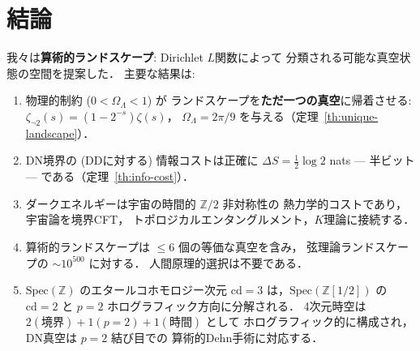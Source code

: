 \documentclass[11pt,a4paper]{article}
\begin{document}
\section{結論}

我々は\textbf{算術的ランドスケープ}: Dirichlet $L$関数によって
分類される可能な真空状態の空間を提案した．
主要な結果は:

\begin{enumerate}
\item 物理的制約 ($0 < \Omega_\Lambda < 1$) が
ランドスケープを\textbf{ただ一つの真空}に帰着させる:
$\zeta_{\neg 2}(s) = (1-2^{-s})\zeta(s)$，
$\Omega_\Lambda = 2\pi/9$ を与える（定理~\ref{th:unique-landscape}）．

\item DN境界の (DDに対する) 情報コストは正確に
$\Delta S = \frac{1}{2}\log 2$ nats --- 半ビット ---
である（定理~\ref{th:info-cost}）．

\item ダークエネルギーは宇宙の時間的 $\mathbb{Z}/2$ 非対称性の
熱力学的コストであり，宇宙論を境界CFT，
トポロジカルエンタングルメント，$K$理論に接続する．

\item 算術的ランドスケープは $\leq 6$ 個の等価な真空を含み，
弦理論ランドスケープの $\sim 10^{500}$ に対する．
人間原理的選択は不要である．

\item $\mathrm{Spec}(\mathbb{Z})$ のエタールコホモロジー次元
$\mathrm{cd} = 3$ は，$\mathrm{Spec}(\mathbb{Z}[1/2])$ の
$\mathrm{cd} = 2$ と $p = 2$ ホログラフィック方向に分解される．
4次元時空は $2(\text{境界}) + 1(p=2) + 1(\text{時間})$ として
ホログラフィック的に構成され，DN真空は $p = 2$ 結び目での
算術的Dehn手術に対応する．
\end{enumerate}
\end{document}
